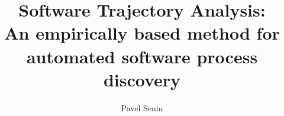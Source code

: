 \documentclass{sig-alternate}
\begin{document}
\title{Software Trajectory Analysis:\\An empirically based method for automated software process discovery}

%
\author{
%
%
\alignauthor Pavel Senin \\
	\\
	\\
	\\
}
\maketitle
\end{document}
